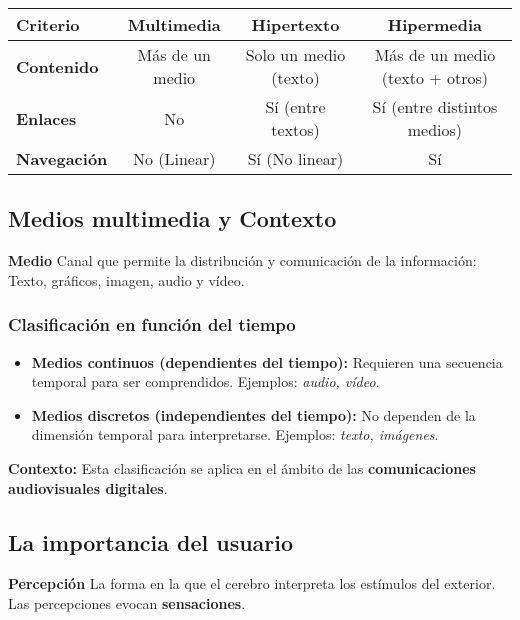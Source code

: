 \documentclass[11pt,a4paper]{article}
\begin{document}
	\begin{center}
		\renewcommand{\arraystretch}{1.4} %
		\begin{tabular}{|l|c|c|c|}
			\hline
			\textbf{Criterio} & \textbf{Multimedia} & \textbf{Hipertexto} & \textbf{Hipermedia} \\
			\hline
			\textbf{Contenido} 
			& Más de un medio
			& Solo un medio (texto) 
			& Más de un medio (texto + otros) \\
			\hline
			\textbf{Enlaces} 
			& No 
			& Sí (entre textos) 
			& Sí (entre distintos medios) \\
			\hline
			\textbf{Navegación} 
			& No (Linear)
			& Sí (No linear)
			& Sí \\
			\hline
		\end{tabular}
	\end{center}
	
	\subsection{Medios multimedia y Contexto}
	\begin{DefBox}
		\textbf{Medio} Canal que permite la distribución y comunicación de la información: Texto, gráficos, imagen, audio y vídeo.
	\end{DefBox}
	
	\subsubsection{Clasificación en función del tiempo}
	
	\begin{itemize}[leftmargin=1.5em]
		\item \textbf{Medios continuos (dependientes del tiempo):}  
		Requieren una secuencia temporal para ser comprendidos.  
		Ejemplos: \textit{audio, vídeo}.
		
		\item \textbf{Medios discretos (independientes del tiempo):}  
		No dependen de la dimensión temporal para interpretarse.  
		Ejemplos: \textit{texto, imágenes}.
	\end{itemize}
	
	\begin{NotaBox}
		\textbf{Contexto:} Esta clasificación se aplica en el ámbito de las \textbf{comunicaciones audiovisuales digitales}.
	\end{NotaBox}
	
	\subsection*{La importancia del usuario}
	\begin{DefBox}
		\textbf{Percepción} La forma en la que el cerebro interpreta los estímulos del exterior. Las percepciones evocan \textbf{sensaciones}.
	\end{DefBox}
\end{document}
